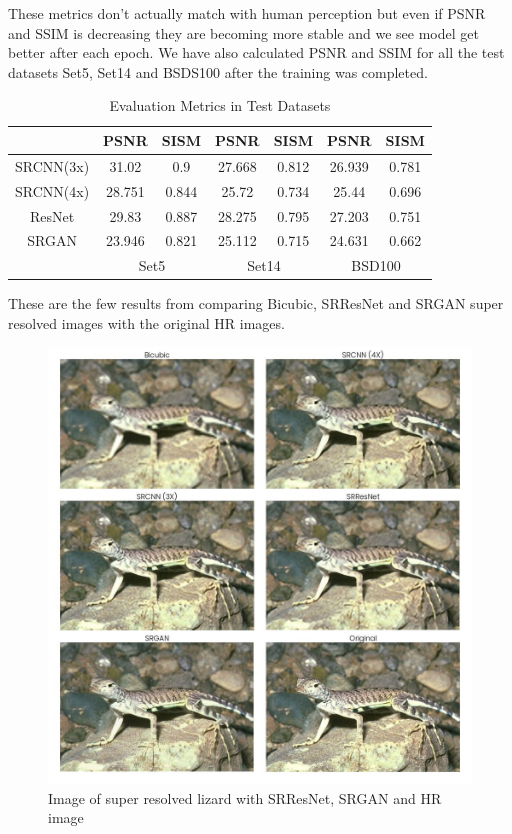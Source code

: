     These metrics don't actually match with human perception but even if PSNR and SSIM is decreasing they are becoming more stable and we see model get better after each epoch.
    We have also calculated PSNR and SSIM for all the test datasets Set5, Set14 and BSDS100 after the training was completed.
\begin{table}[h]
    \centering
    \begin{tabular}{|c|c|c|c|c|c|c|}
    \hline
    &PSNR & SISM & PSNR & SISM & PSNR & SISM \\
    \hline
    SRCNN(3x)&31.02 & 0.9 & 27.668 & 0.812 & 26.939 & 0.781 \\
    \hline
    SRCNN(4x)&28.751 & 0.844 & 25.72 & 0.734 & 25.44 & 0.696 \\
    \hline
    ResNet&29.83 & 0.887 & 28.275 & 0.795 & 27.203 & 0.751 \\
    \hline
    SRGAN &23.946 & 0.821 &25.112 & 0.715 & 24.631 & 0.662 \\
    \hline
    & \multicolumn{2}{|c|}{Set5}& \multicolumn{2}{|c|}{Set14} & \multicolumn{2}{|c|}{BSD100} \\
    \hline
    \end{tabular}
    \caption{Evaluation Metrics in Test Datasets}
\end{table}
\clearpage
\newpage
    These are the few results from comparing Bicubic, SRResNet and SRGAN super resolved images with the original HR images.
    \begin{figure}[t]
        \centering
        \includegraphics[width=5.5in]{./figures/examples/lizard.jpg}
        \caption{Image of super resolved lizard with SRResNet, SRGAN and HR image}
    \end{figure}
